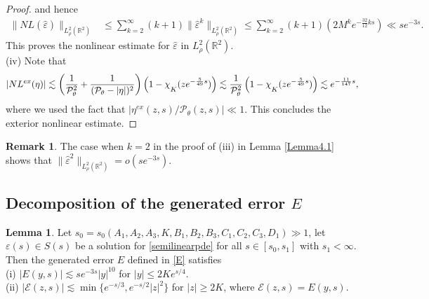 \documentclass[11pt,reqno]{amsart}
\theoremstyle{definition}
\theoremstyle{bfremark}
\newtheorem{remark}{Remark}[section]
\newtheorem{lemma}{Lemma}[section]
\numberwithin{equation}{section}
\newcommand{\veph}{\hat\varepsilon }
\newcommand{\mchi}{\raisebox{0pt}[1ex][1ex]{$\chi$}}
\begin{document}
\begin{proof}
    and hence
    \begin{align*}
        \|NL(\veph)\|_{L^2_{\rho}(\mathbb{R}^2)} &\leq \sum_{k=2}^{\infty}(k+1) \|\veph^k\|_{L^2_{\rho}(\mathbb{R}^2)} \leq\sum_{k=2}^{\infty}(k+1)(2M^ke^{-\frac{32}{12}ks})\ll se^{-3s}.
    \end{align*}
    This proves the nonlinear estimate for \(\veph\) in \(L^2_{\rho}(\mathbb{R}^2)\).\\
   (iv) Note that 
    \begin{align*}
        |NL^{ex}(\eta)| \lesssim\left( \frac{1}{\mathcal{P}_{\theta}^2}+\frac{1}{(\mathcal{P}_{\theta}-|\eta|)^2}\right)\left(1-\mchi_{K}(ze^{-\frac{5}{49}s})\right)\lesssim \frac{1}{\mathcal{P}_{\theta}^2}\left(1-\mchi_{K}(ze^{-\frac{5}{49}s})\right) \lesssim e^{-\frac{11}{147}s},
    \end{align*}
    where we used the fact that \(|\eta^{ex}(z,s)/\mathcal{P}_{\theta}(z,s)| \ll 1\). This concludes the exterior nonlinear estimate.
\end{proof}

\begin{remark}
\label{rmk:veph^2 estimate}
    The case when \(k=2\) in the proof of (iii) in Lemma \ref{Lemma4.1} shows that \(\|\veph^2\|_{L^2_{\rho}(\mathbb{R}^2)}=o(se^{-3s})\).
\end{remark}

\medskip

\subsection{Decomposition of the generated error \(E\)}
\begin{lemma}
\label{Lemma4.2}
Let \(s_0 = s_0(A_1, A_2,A_3,K,B_1,B_2,B_3,C_1,C_2,C_3,D_1) \gg 1\), let \(\varepsilon(s) \in S(s)\) be a solution for \ref{semilinearpde} for all \(s \in [s_0,s_1]\) with \(s_1<\infty\). Then the generated error \(E\) defined in \ref{E} satisfies\\


(i) \(|E(y,s)| \lesssim se^{-3s}|y|^{10}\) for \(|y| \leq 2Ke^{s/4}\).\\

(ii) \(|\mathcal{E}(z,s)| \lesssim \min{\{e^{-s/3},e^{-s/2}|z|^2\}} \) for \(|z|  \geq 2K\), where \(\mathcal{E}(z,s)=E(y,s)\).
\end{lemma}
\end{document}
